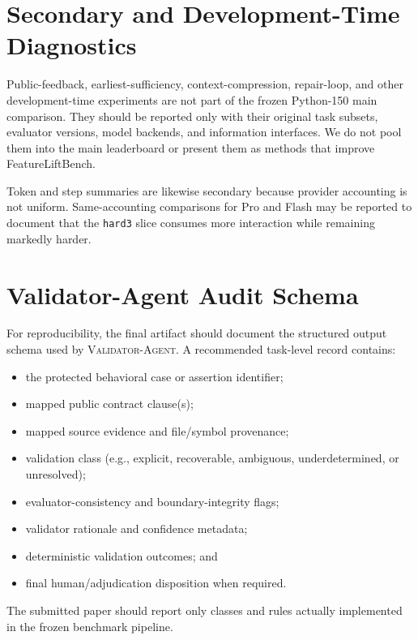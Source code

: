 \documentclass[acmsmall,screen,review,anonymous]{acmart}
\newcommand{\validatoragent}{\textsc{Validator-Agent}\xspace}
\begin{document}
\section{Secondary and Development-Time Diagnostics}
\label{app:secondary}

Public-feedback, earliest-sufficiency, context-compression, repair-loop, and other
development-time experiments are not part of the frozen Python-150 main comparison.
They should be reported only with their original task subsets, evaluator versions,
model backends, and information interfaces. We do not pool them into the main
leaderboard or present them as methods that improve FeatureLiftBench.

Token and step summaries are likewise secondary because provider accounting is not
uniform. Same-accounting comparisons for Pro and Flash may be reported to document
that the \texttt{hard3} slice consumes more interaction while remaining markedly
harder.

\section{Validator-Agent Audit Schema}
\label{app:validator-schema}

For reproducibility, the final artifact should document the structured output
schema used by \validatoragent. A recommended task-level record contains:
\begin{itemize}
  \item the protected behavioral case or assertion identifier;
  \item mapped public contract clause(s);
  \item mapped source evidence and file/symbol provenance;
  \item validation class (e.g., explicit, recoverable, ambiguous,
        underdetermined, or unresolved);
  \item evaluator-consistency and boundary-integrity flags;
  \item validator rationale and confidence metadata;
  \item deterministic validation outcomes; and
  \item final human/adjudication disposition when required.
\end{itemize}
The submitted paper should report only classes and rules actually implemented in
the frozen benchmark pipeline.



\end{document}
